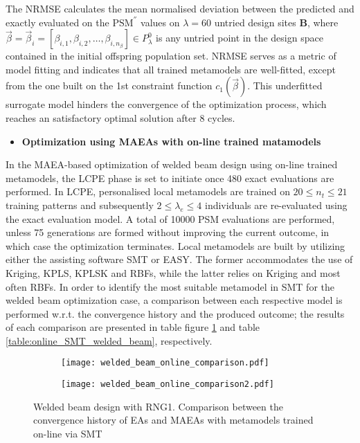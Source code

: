 The NRMSE calculates the mean normalised deviation between the 
predicted and exactly evaluated on the $\mathrm{PSM}^{''}$ values 
on $λ\!=\!60$ untried design sites $\mathbf{Β}$, where $\vec{β} 
\!= \!\vec{β}_{i} \!= \![β_{i,1}, β_{i,2}, \hdots, β_{i,n_{β}}] \in 
P_{λ}^{0}$ is any untried point in the design space contained in 
the initial offspring population set. NRMSE serves as a metric of 
model fitting and indicates that all trained metamodels are 
well-fitted, except from the one built on the 1st constraint 
function $c_{1}(\vec{β})$. This underfitted surrogate model hinders 
the convergence of the optimization process, which reaches an 
satisfactory optimal solution after 8 cycles. 

\newpage


\begin{itemize}
\item \textbf{Optimization using MAEAs with on-line trained 
matamodels}
\end{itemize}

In the MAEA-based optimization of welded beam design using on-line 
trained metamodels, the LCPE phase is set to initiate once 480 
exact evaluations are performed. In LCPE, personalised local
metamodels are trained on $20 \leq n_{t} \leq 21$ training 
patterns and subsequently  $2 \leq λ_{e} \leq 4$ individuals
are re-evaluated using the exact evaluation model. A total of 
10000 PSM evaluations are performed, unless 75
generations are formed without improving the current outcome, in 
which case the optimization terminates. Local metamodels are built 
by utilizing either the assisting software SMT or EASY. The former 
accommodates the use of Kriging, KPLS, KPLSK and RBFs, while the 
latter relies on Kriging and most often RBFs. In order to identify 
the most suitable metamodel in SMT for the welded beam 
optimization case, a comparison between each respective model 
is performed w.r.t. the convergence history and the produced 
outcome; the results of each comparison are presented in table 
figure \ref{fig:SMT_models_welded_beam} and table  
\ref{table:online_SMT_welded_beam}, respectively.  

\begin{figure}[h!]
\centering
	\begin{subfigure}[b]{0.49\textwidth}
	\centering
	\texttt{[image: welded\_beam\_online\_comparison.pdf]}
	\end{subfigure}
	\hfill
	\begin{subfigure}[b]{0.49\textwidth}
	\centering
	\texttt{[image: welded\_beam\_online\_comparison2.pdf]}
	\end{subfigure}   
\caption{Welded beam design with RNG1. Comparison between the 
convergence history of EAs and MAEAs with metamodels trained 
on-line via SMT} 
\label{fig:SMT_models_welded_beam}
\end{figure}

